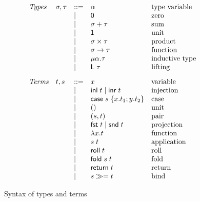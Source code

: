 \begin{figure}
  \small
  \[
  \begin{array}{lllll}
    \textit{Types} &
    \sigma, \tau
    & ::= &
    \alpha
    &
    \text{type variable}
    \\
    && \mid &
    \mathsf{0}
    &
    \text{zero}
    \\
    && \mid &
    \sigma + \tau
    &
    \text{sum}
    \\
    && \mid &
    \mathsf{1}
    &
    \text{unit}
    \\
    && \mid &
    \sigma \times \tau
    &
    \text{product}
    \\
    && \mid &
    \sigma \to \tau
    &
    \text{function}
    \\
    && \mid &
    \mu\alpha.\tau
    &
    \text{inductive type}
    \\
    && \mid &
    \mathsf{L}\;\tau
    &
    \text{lifting}
    \\[3mm]
    \textit{Terms} &
    t, s
    & ::= &
    x
    &
    \text{variable}
    \\
    && \mid &
    \mathsf{inl}\;t \mid \mathsf{inr}\;t
    &
    \text{injection}
    \\
    && \mid &
    \mathsf{case}\;s\;\{x.t_1; y.t_2\}
    &
    \text{case}
    \\
    && \mid &
    ()
    &
    \text{unit}
    \\
    && \mid &
    (s,t)
    &
    \text{pair}
    \\
    && \mid &
    \mathsf{fst}\;t \mid \mathsf{snd}\;t
    &
    \text{projection}
    \\
    && \mid &
    \lambda x.t
    &
    \text{function}
    \\
    && \mid &
    s\;t
    &
    \text{application}
    \\
    && \mid &
    \mathsf{roll}\;t
    &
    \text{roll}
    \\
    && \mid &
    \mathsf{fold}\;s\;t
    &
    \text{fold}
    \\
    && \mid &
    \mathsf{return}\;t
    &
    \text{return}
    \\
    && \mid &
    {s}\gg={t}
    &
    \text{bind}
  \end{array}
  \]
  \caption{Syntax of types and terms}
  \label{fig:syntax}
\end{figure}
